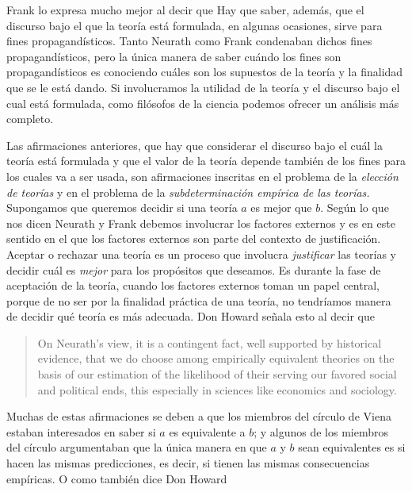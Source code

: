 Frank lo expresa mucho mejor al decir que  \parencite[p.~4]{Frank1956}
Hay que saber, además, que el discurso bajo el que la teoría está formulada, en algunas ocasiones, sirve para fines propagandísticos.
Tanto Neurath como Frank condenaban dichos fines propagandísticos, pero la única manera de saber cuándo los fines son propagandísticos es conociendo cuáles son los supuestos de la teoría y la finalidad que se le está dando.
Si involucramos la utilidad de la teoría y el discurso bajo el cual está formulada, como filósofos de la ciencia podemos ofrecer un análisis más completo.

Las afirmaciones anteriores, que hay que considerar el discurso bajo el cuál la teoría está formulada y que el valor de la teoría depende también de los fines para los cuales va a ser usada, son afirmaciones inscritas en el problema de la \emph{elección de teorías} y en el problema de la \emph{subdeterminación empírica de las teorías.}
Supongamos que queremos decidir si una teoría $a$ es mejor que $b$. 
Según lo que nos dicen Neurath y Frank debemos involucrar los factores externos y es en este sentido en el que los factores externos son parte del contexto de justificación.
Aceptar o rechazar una teoría es un proceso que involucra \emph{justificar} las teorías y decidir cuál es \emph{mejor} para los propósitos que deseamos.
Es durante la fase de aceptación de la teoría, cuando los factores externos toman un papel central, porque de no ser por la finalidad práctica de una teoría, no tendríamos manera de decidir qué teoría es más adecuada.
Don Howard señala esto al decir que 

\begin{quote}
	On Neurath’s view, it is a contingent fact, well supported by historical evidence, that we do choose among empirically equivalent theories on the basis of our estimation of the likelihood of their serving our favored social and political ends, this especially in sciences like economics and sociology. \parencite[p.~5]{Howard2006}
\end{quote}

Muchas de estas afirmaciones se deben a que los miembros del círculo de Viena estaban interesados en saber si $a$ es equivalente a $b$;
y algunos de los miembros del círculo argumentaban que la única manera en que $a$ y $b$ sean equivalentes es si hacen las mismas predicciones, es decir, si tienen las mismas consecuencias empíricas.
O como también dice Don Howard

